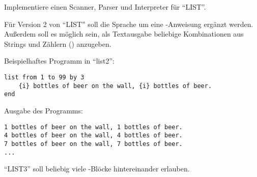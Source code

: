 \documentclass[fontsize=10pt, a4paper, ngerman]{scrartcl}
\begin{document}
\begin{aufgabe}[subtitle=list 1.0]
\begin{itemize}
			\begin{center}
			\end{center}
	\end{itemize}

	Implementiere einen Scanner, Parser und Interpreter für \enquote{LIST}.

\end{aufgabe}

\begin{aufgabe}[subtitle=list 2.0]
	\label{aufg:list-v2}
	Für Version 2 von \enquote{LIST} soll die Sprache um eine -Anweisung ergänzt werden. Außerdem
	soll es möglich sein, als Textausgabe beliebige Kombinationen aus Strings und Zählern
	() anzugeben.

	\begin{minipage}[t]{.6\textwidth}\small
		Beispielhaftes Programm in \enquote{list2}:
		\begin{verbatim}
list from 1 to 99 by 3
    {i} bottles of beer on the wall, {i} bottles of beer.
end
		\end{verbatim}
		\end{minipage}\hfill\begin{minipage}[t]{.4\textwidth}\small
		Ausgabe des Programms:
		\begin{verbatim}
1 bottles of beer on the wall, 1 bottles of beer.
4 bottles of beer on the wall, 4 bottles of beer.
7 bottles of beer on the wall, 7 bottles of beer.
...
		\end{verbatim}
	\end{minipage}
\end{aufgabe}

\begin{aufgabe}[subtitle=list 3.0]
	\label{aufg:list-v3}
	\enquote{LIST3} soll beliebig viele -Blöcke hintereinander erlauben.
\end{aufgabe}
\end{document}
